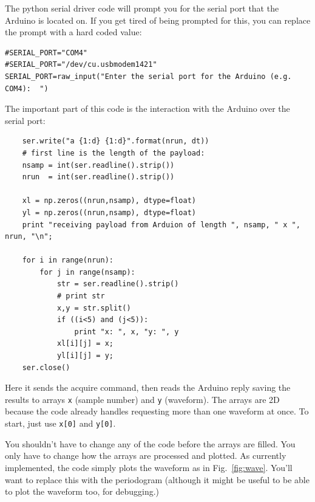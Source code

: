 \documentclass[12pt]{article}
\begin{document}
The python serial driver code will prompt you for the serial port that the Arduino is located on.  If you get tired of being prompted for this, you can replace the prompt with a hard coded value:
\begin{verbatim}
#SERIAL_PORT="COM4"                                                                                                     
#SERIAL_PORT="/dev/cu.usbmodem1421"                                                                                     
SERIAL_PORT=raw_input("Enter the serial port for the Arduino (e.g. COM4):  ")
\end{verbatim}
The important part of this code is the interaction with the Arduino over the serial port:
\begin{verbatim}
    ser.write("a {1:d} {1:d}".format(nrun, dt))
    # first line is the length of the payload:                                                                          
    nsamp = int(ser.readline().strip())
    nrun  = int(ser.readline().strip())

    xl = np.zeros((nrun,nsamp), dtype=float)
    yl = np.zeros((nrun,nsamp), dtype=float)
    print "receiving payload from Arduion of length ", nsamp, " x ", nrun, "\n";

    for i in range(nrun):
        for j in range(nsamp):
            str = ser.readline().strip()
            # print str                                                                                                 
            x,y = str.split()
            if ((i<5) and (j<5)):
                print "x: ", x, "y: ", y
            xl[i][j] = x;
            yl[i][j] = y;
    ser.close()
\end{verbatim}
Here it sends the acquire command, then reads the Arduino reply saving the results to arrays {\tt x} (sample number) and {\tt y} (waveform).  The arrays are 2D because the code already handles requesting more than one waveform at once.  To start, just use {\tt x[0]} and {\tt y[0]}. 

You shouldn't have to change any of the code before the arrays are filled.  You only have to change how the arrays are processed and plotted.  As currently implemented, the code simply plots the waveform as in Fig.~\ref{fig:wave}.  You'll want to replace this with the periodogram (although it might be useful to be able to plot the waveform too, for debugging.)
  
\end{document}
